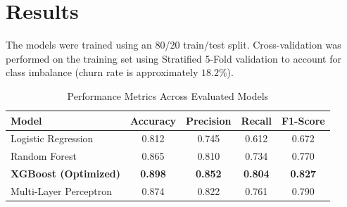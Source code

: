 \section{Results}
The models were trained using an 80/20 train/test split. Cross-validation was performed on the training set using Stratified 5-Fold validation to account for class imbalance (churn rate is approximately $18.2\%$).

\begin{table}[h]
\centering
\begingroup
\setlength{\parindent}{0pt}
\setlength{\parskip}{0pt}
\caption{Performance Metrics Across Evaluated Models}
\label{tab:results}
\vspace{0.5em}
\begin{tabular}{l c c c c}
\toprule
Model & Accuracy & Precision & Recall & F1-Score \\
\midrule
Logistic Regression & 0.812 & 0.745 & 0.612 & 0.672 \\
Random Forest & 0.865 & 0.810 & 0.734 & 0.770 \\
\textbf{XGBoost (Optimized)} & \textbf{0.898} & \textbf{0.852} & \textbf{0.804} & \textbf{0.827} \\
Multi-Layer Perceptron & 0.874 & 0.822 & 0.761 & 0.790 \\
\bottomrule
\end{tabular}
\endgroup
\end{table}
